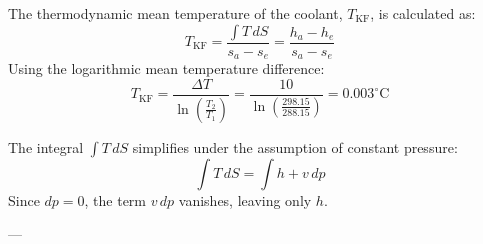The thermodynamic mean temperature of the coolant, \( T_{\text{KF}} \), is calculated as:  
\[
T_{\text{KF}} = \frac{\int T \, dS}{s_a - s_e} = \frac{h_a - h_e}{s_a - s_e}
\]  
Using the logarithmic mean temperature difference:  
\[
T_{\text{KF}} = \frac{\Delta T}{\ln \left( \frac{T_2}{T_1} \right)} = \frac{10}{\ln \left( \frac{298.15}{288.15} \right)} = 0.003^\circ\text{C}
\]  

The integral \( \int T \, dS \) simplifies under the assumption of constant pressure:  
\[
\int T \, dS = \int h + v \, dp
\]  
Since \( dp = 0 \), the term \( v \, dp \) vanishes, leaving only \( h \).  

---